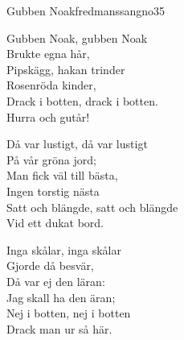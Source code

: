 \begin{song}{Gubben Noak}{fredmanssangno35}
\begin{vers}
Gubben Noak, gubben Noak\\
Brukte egna hår,\\
Pipskägg, hakan trinder\\
Rosenröda kinder,\\
Drack i botten, drack i botten.\\
Hurra och gutår!\\
\end{vers}
\begin{vers}
Då var lustigt, då var lustigt\\
På vår gröna jord;\\
Man fick väl till bästa,\\
Ingen torstig nästa\\
Satt och blängde, satt och blängde\\
Vid ett dukat bord.\\
\end{vers}
\begin{vers}
Inga skålar, inga skålar\\
Gjorde då besvär,\\
Då var ej den läran:\\
Jag skall ha den äran;\\
Nej i botten, nej i botten\\
Drack man ur så här.\\
\end{vers}
\end{song}
